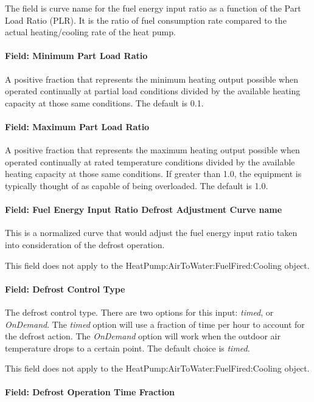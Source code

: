 The field is curve name for the fuel energy input ratio as a function of the Part Load Ratio (PLR). It is the ratio of fuel consumption rate compared to the actual heating/cooling rate of the heat pump.

\paragraph{Field: Minimum Part Load Ratio}

A positive fraction that represents the minimum heating output possible when operated continually at partial load conditions divided by the available heating capacity at those same conditions. The default is 0.1.

\paragraph{Field: Maximum Part Load Ratio}

A positive fraction that represents the maximum heating output possible when operated continually at rated temperature conditions divided by the available heating capacity at those same conditions. If greater than 1.0, the equipment is typically thought of as capable of being overloaded. The default is 1.0.

\paragraph{Field: Fuel Energy Input Ratio Defrost Adjustment Curve name}
This is a normalized curve that would adjust the fuel energy input ratio taken into consideration of the defrost operation.

This field does not apply to the HeatPump:AirToWater:FuelFired:Cooling object.

\paragraph{Field: Defrost Control Type}

The defrost control type. There are two options for this input: \emph{timed}, or \emph{OnDemand}. The \emph{timed} option will use a fraction of time per hour to account for the defrost action. The \emph{OnDemand} option will work when the outdoor air temperature drops to a certain point. The default choice is \emph{timed}.

This field does not apply to the HeatPump:AirToWater:FuelFired:Cooling object.

\paragraph{Field: Defrost Operation Time Fraction}

